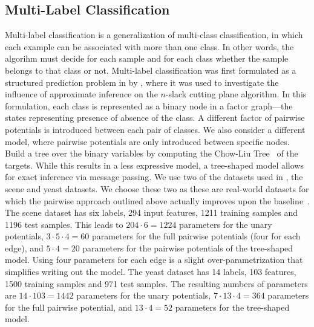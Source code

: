 \subsection{Multi-Label Classification}
Multi-label classification is a generalization of multi-class classification,
in which each example can be associated with more than one class. In other
words, the algorihm must decide for each sample and for each class whether the
sample belongs to that class or not.
Multi-label classification was first formulated as a structured prediction problem
in by \citet{finley2008training}, where it was used to investigate the influence of
approximate inference on the $n$-slack cutting plane algorithm. In this formulation,
each class is represented as a binary node in a factor graph---the states representing
presence of absence of the class. A different factor of pairwise potentials is introduced
between each pair of classes.
We also consider a different model, where pairwise potentials are only
introduced between specific nodes. Build a tree over the binary variables by
computing the Chow-Liu Tree~\citep{chow1968approximating} of the targets. While
this results in a less expressive model, a tree-shaped model allows for exact
inference via message passing.
We use two of the datasets used in \citet{finley2008training}, the scene
and yeast datasets. We choose these two as these are real-world datasets for
which the pairwise approach outlined above actually improves upon the
baseline~\citep{finley2008training}.
The scene dataset has six labels, 294 input features, 1211 training samples and
1196 test samples. This leads to $204 \cdot 6 = 1224$ parameters for the unary potentials,
$3 \cdot 5 \cdot 4 = 60$ parameters for the full pairwise potentials (four for each edge), and
$5 \cdot 4 = 20$ parameters for the pairwise potentials of the tree-shaped model.
Using four parameters for each edge is a slight over-parametrization that
simplifies writing out the model.
The yeast dataset has 14 labels, 103 features, 1500 training samples and 971
test samples. The resulting numbers of parameters are $14 \cdot 103=1442$ parameters
for the unary potentials, $7 \cdot 13 \cdot 4=364$ parameters for the full pairwise
potential, and $13 \cdot 4=52$ parameters for the tree-shaped model.

